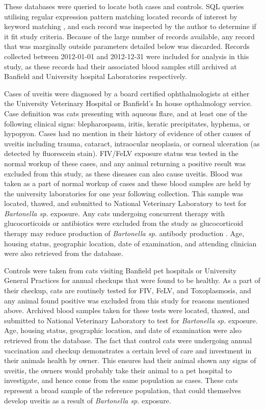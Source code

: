 \documentclass[11pt,twocolumn]{article}
\begin{document}
	These databases were queried to locate both cases and controls. SQL queries utilising regular expression pattern matching located records of interest by keyword matching , and each record was inspected by the author to determine if it fit study criteria. Because of the large number of records available, any record that was marginally outside parameters detailed below was discarded.
	Records collected between 2012-01-01 and 2012-12-31 were included for analysis in this study, as these records had their associated blood samples still archived at Banfield and University hospital Laboratories respectively.


	Cases of uveitis were diagnosed by a board certified ophthalmologists at either the University Veterinary Hospital or Banfield's In house opthalmology service.
	Case definition was cats presenting with aqueous flare, and at least one of the following clinical signs: blepharospasm, iritis, keratic precipitates, hyphema, or hypopyon. 
	Cases had no mention in their history of evidence of other causes of uveitis including trauma, cataract, intraocular neoplasia, or corneal ulceration (as detected by fluorescein stain). 
	FIV/FeLV exposure status was tested in the normal workup of these cases, and any animal returning a positive result was excluded from this study, as these diseases can also cause uveitis. 
	Blood was taken as a part of normal workup of cases and these blood samples are held by the university laboratories for one year following collection. This sample was located, thawed, and submitted to National Veterinary Laboratory to test for \emph{Bartonella sp.} exposure.
	Any cats undergoing concurrent therapy with glucocorticoids or antibiotics were excluded from the study as glucocorticoid therapy may reduce production of \emph{Bartonella sp.} antibody production \cite{Lappin2000}.
	Age, housing status, geographic location, date of examination, and attending clinician  were also retrieved from the database. 



	Controls were taken from cats visiting Banfield pet hospitals or University General Practices for annual checkups that were found to be healthy. 
	As a part of their checkup, cats are routinely tested for FIV, FeLV, and Toxoplasmosis, and any animal found positive was excluded from this study for reasons mentioned above. 
	Archived blood samples taken for these tests were located, thawed, and submitted to National Veterinary Laboratory to test for \emph{Bartonella sp.} exposure.
	Age, housing status, geographic location, and date of examination were also retrieved from the database. 
		The fact that control cats were undergoing annual vaccination and checkup demonstrates a certain level of care and investment in their animals health by owner. This ensures had their animal shown any signs of uveitis, the owners would probably take their animal to a pet hospital to investigate, and hence come from the same population as cases.
	These cats represent a broad sample of the reference population, that could themselves develop uveitis as a result of \emph{Bartonella sp.} exposure.
\end{document}
